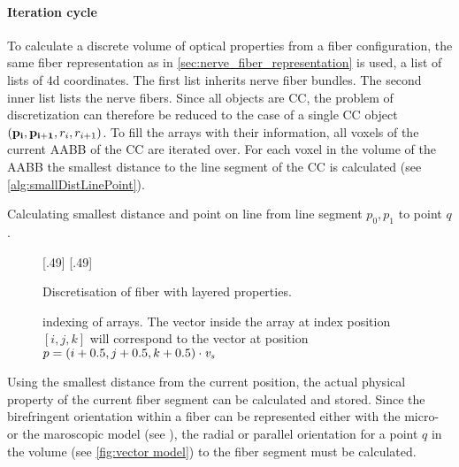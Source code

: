 \paragraph{Iteration cycle}
To calculate a discrete volume of optical properties from a fiber configuration, the same fiber representation as in \cref{sec:nerve_fiber_representation} is used, \ie{} a list of lists of 4d coordinates.
The first list inherits nerve fiber bundles.
The second inner list lists the nerve fibers.
Since all objects are \ac{CC}, the problem of discretization can therefore be reduced to the case of a single \ac{CC} object $(\mathbf{p_i}, \mathbf{p_{i+1}}, r_i, r_{i+1})$.
% 
To fill the arrays with their information, all voxels of the current \ac{AABB} of the \ac{CC} are iterated over.
For each voxel in the volume of the \ac{AABB} the smallest distance to the line segment of the \ac{CC} is calculated (see \cref{alg:smallDistLinePoint}).
\\
% 
\begin{lstfloat}[!tb]

\caption[Calculating smallest distance between line segment and point]{Calculating smallest distance and point on line from line segment $p_0, p_1$ to point $q$.}
\label{alg:smallDistLinePoint}
\end{lstfloat}
% 
\begin{figure}[!t]
\centering
\setlength{\tikzwidth}{0.45\textwidth}
[.49\textwidth]{
} \hfill
{}[.49\textwidth]{
}
\caption{Discretisation of fiber with layered properties.}
\label{fig:fiber_discretisation}
\end{figure}
% 
\begin{figure}[!t]
\centering
\def\tikzwidth{0.42\textwidth}
\caption{indexing of arrays.
The vector inside the array at index position $[i,j,k]$ will correspond to the vector at position $p=(i+0.5,j+0.5,k+0.5) \cdot \textnormal{$\mathit{v_{s}}$}$}
\label{fig:indexing_array}
\end{figure}
% 
Using the smallest distance from the current position, the actual physical property of the current fiber segment can be calculated and stored.
Since the birefringent orientation within a fiber can be represented either with the micro- or the maroscopic model (see \dummy{}), the radial or parallel orientation for a point $q$ in the volume (see \cref{fig:vector model}) to the fiber segment must be calculated.

